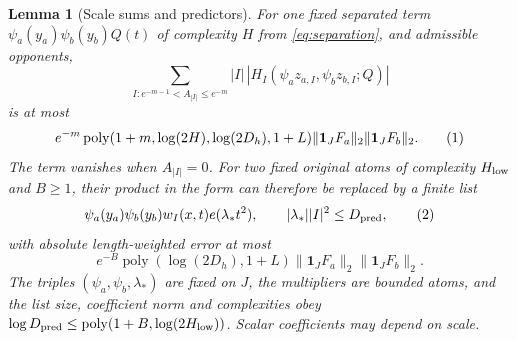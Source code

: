 \documentclass[11pt]{article}
\newtheorem{lemma}[theorem]{Lemma}
\theoremstyle{definition}
\newcommand{\one}{\mathbf 1}
\newcommand{\poly}{\operatorname{poly}}
\newcommand{\eqtag}[1]{\refstepcounter{equation}\tag{\theequation}\label{#1}}
\numberwithin{equation}{section}
\begin{document}
\begin{lemma}[Scale sums and predictors]\label{lem:predictors}
For one fixed separated term $\psi_a(y_a)\psi_b(y_b)Q(t)$ of complexity $H$ from \eqref{eq:separation}, and admissible opponents,
\[
 \sum_{I:e^{-m-1}<A_{|I|}\le e^{-m}}|I|\,|H_I(\psi_az_{a,I},\psi_bz_{b,I};Q)|
\]
is at most
\[
 e^{-m}\poly(1+m,\log(2H),\log(2D_h),1+L)\|\one_JF_a\|_2\|\one_JF_b\|_2.
 \eqtag{eq:band-scale-sum}
\]
The term vanishes when $A_{|I|}=0$. For two fixed original atoms of complexity $H_{\rm low}$ and $B\ge1$, their product in the form can therefore be replaced by a finite list
\[
 \psi_a(y_a)\psi_b(y_b)w_I(x,t)e(\lambda_*t^2),\qquad |\lambda_*||I|^2\le D_{\rm pred},
 \eqtag{eq:predictors}
\]
with absolute length-weighted error at most
\[
 e^{-B}\poly(\log(2D_h),1+L)\|\one_JF_a\|_2\|\one_JF_b\|_2.
\]
The triples $(\psi_a,\psi_b,\lambda_*)$ are fixed on $J$, the multipliers are bounded atoms, and the list size, coefficient norm and complexities obey $\log D_{\rm pred}\le\poly(1+B,\log(2H_{\rm low}))$. Scalar coefficients may depend on scale.
\end{lemma}
\end{document}
